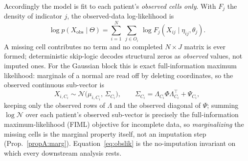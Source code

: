Accordingly the model is fit to each patient's \emph{observed cells only}. With $F_j$ the
density of indicator $j$, the observed-data log-likelihood is
\begin{equation}
  \log p\!\left(X_{\mathrm{obs}}\mid\Theta\right)=\sum_{i=1}^{N}\ \sum_{j\in O_i}\ \log F_j\!\left(X_{ij}\mid\eta_{ij},\theta_j\right) .
  \label{eq:obslik}
\end{equation}
A missing cell contributes no term and no completed $N\times J$ matrix is ever formed;
deterministic skip-logic decodes structural zeros as \emph{observed} values, not imputed
ones. For the Gaussian block this is exact full-information maximum likelihood: marginals of a
normal are read off by deleting coordinates, so the observed continuous sub-vector is
\begin{equation}
  X_{i,C_i}\sim\mathcal N\!\big(\mu_{i,C_i},\,\Sigma_{C_i}\big),\qquad
  \Sigma_{C_i}=\Lambda_{C_i}\Phi\Lambda_{C_i}^{\top}+\Psi_{C_i},
  \label{eq:m-marg}
\end{equation}
keeping only the observed rows of $\Lambda$ and the observed diagonal of $\Psi$; summing
$\log\mathcal N$ over each patient's observed sub-vector is precisely the full-information
maximum-likelihood (FIML) objective for incomplete data, so \emph{marginalizing} the missing
cells is the marginal property itself, not an imputation step (Prop.~\ref{propA:marg}).
Equation~\eqref{eq:obslik} is the no-imputation invariant on which every downstream analysis
rests.

